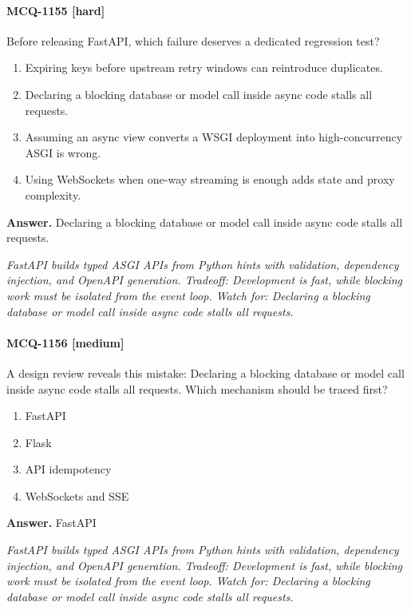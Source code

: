 \paragraph{MCQ-1155 [hard]} Before releasing FastAPI, which failure deserves a dedicated regression test?
\begin{enumerate}[label=\Alph*.]
\item Expiring keys before upstream retry windows can reintroduce duplicates.
\item Declaring a blocking database or model call inside async code stalls all requests.
\item Assuming an async view converts a WSGI deployment into high-concurrency ASGI is wrong.
\item Using WebSockets when one-way streaming is enough adds state and proxy complexity.
\end{enumerate}
\noindent\textbf{Answer.} Declaring a blocking database or model call inside async code stalls all requests.
\par\textit{FastAPI builds typed ASGI APIs from Python hints with validation, dependency injection, and OpenAPI generation. Tradeoff: Development is fast, while blocking work must be isolated from the event loop. Watch for: Declaring a blocking database or model call inside async code stalls all requests.}
\paragraph{MCQ-1156 [medium]} A design review reveals this mistake: Declaring a blocking database or model call inside async code stalls all requests. Which mechanism should be traced first?
\begin{enumerate}[label=\Alph*.]
\item FastAPI
\item Flask
\item API idempotency
\item WebSockets and SSE
\end{enumerate}
\noindent\textbf{Answer.} FastAPI
\par\textit{FastAPI builds typed ASGI APIs from Python hints with validation, dependency injection, and OpenAPI generation. Tradeoff: Development is fast, while blocking work must be isolated from the event loop. Watch for: Declaring a blocking database or model call inside async code stalls all requests.}
